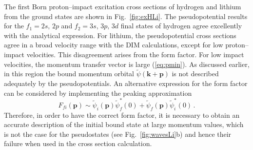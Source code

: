 \documentclass[10pt]{article}
\begin{document}
The first Born proton--impact excitation cross sections of hydrogen 
and lithium from the ground states are shown in Fig.~\ref{fig:exHLi}.
The pseudopotential results for the $f_1=2s,\,2p$ and 
$f_2=3s,\,3p,\,3d$ final states of hydrogen agree excellently with 
the analytical expression. For lithium, the pseudopotential cross 
sections agree in a broad velocity range with the DIM calculations, 
except for low proton--impact velocities. This disagreement arises 
from the form factor. For low impact velocities, the momentum 
transfer vector is large (\ref{eq:pmin}). As discussed earlier, in 
this region the bound momentum orbital 
$\widetilde{\psi}(\mathbf{k}+\mathbf{p})$ is not described adequately 
by the pseudopotentials. An alternative expression for the form 
factor can be considered by implementing the peaking approximation
\begin{equation}
 F_{\!fi}(\mathbf{p}) \sim \widetilde{\psi}_i(\mathbf{p})\widetilde{\psi}_{\!f}^*(0)
 +\widetilde{\psi}_{\!f}(\mathbf{p})\widetilde{\psi}_i^*(0)\,.
\end{equation}
Therefore, in order to have the correct form factor, it is necessary 
to obtain an accurate description of the initial bound state at large 
momentum values, which is not the case for the pseudostates (see 
Fig.~\ref{fig:wavesLi}b) and hence their failure when used in the 
cross section calculation. 
\end{document}
